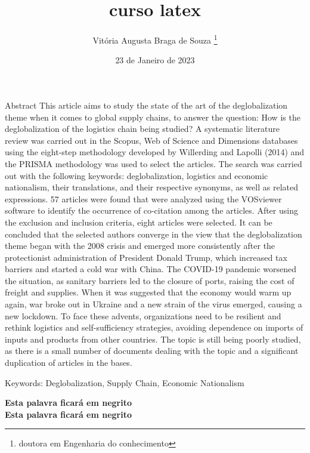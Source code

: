 \documentclass[12pt, a4paper, oneside]{book}
\begin{document}
\title{curso latex}
\author{Vitória Augusta Braga de Souza \footnote{doutora em Engenharia do conhecimento}}
\date{23 de Janeiro de 2023}
\maketitle %
\begin{flushleft}%

Abstract
This article aims to study the state of the art of the deglobalization theme when it comes to global supply chains, to answer the question: How is the deglobalization of the logistics chain being studied? A systematic literature review was carried out in the Scopus, Web of Science and Dimensions databases using the eight-step methodology developed by Willerding and Lapolli (2014) and the PRISMA methodology was used to select the articles. The search was carried out with the following keywords: deglobalization, logistics and economic nationalism, their translations, and their respective synonyms, as well as related expressions. 57 articles were found that were analyzed using the VOSviewer software to identify the occurrence of co-citation among the articles. After using the exclusion and inclusion criteria, eight articles were selected. It can be concluded that the selected authors converge in the view that the deglobalization theme began with the 2008 crisis and emerged more consistently after the protectionist administration of President Donald Trump, which increased tax barriers and started a cold war with China. The COVID-19 pandemic worsened the situation, as sanitary barriers led to the closure of ports, raising the cost of freight and supplies. When it was suggested that the economy would warm up again, war broke out in Ukraine and a new strain of the virus emerged, causing a new lockdown. To face these advents, organizations need to be resilient and rethink logistics and self-sufficiency strategies, avoiding dependence on imports of inputs and products from other countries. The topic is still being poorly studied, as there is a small number of documents dealing with the topic and a significant duplication of articles in the bases.\newline

Keywords: Deglobalization, Supply Chain, Economic Nationalism
\end{flushleft}

\noindent
\textbf {Esta palavra ficará em negrito}\\
{\bfseries Esta palavra ficará em negrito}\\
\end{document}
